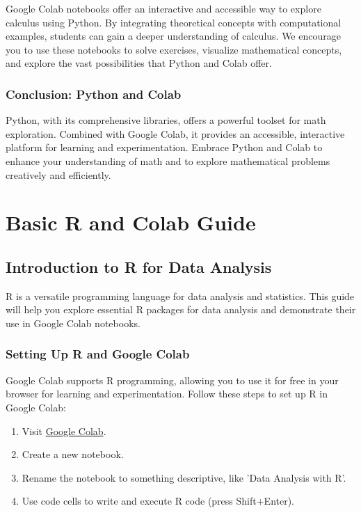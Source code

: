 \documentclass[a4paper,12pt]{book}
\newcounter{problem}
\newcounter{example}
\begin{document}
Google Colab notebooks offer an interactive and accessible way to explore calculus using Python. By integrating theoretical concepts with computational examples, students can gain a deeper understanding of calculus. We encourage you to use these notebooks to solve exercises, visualize mathematical concepts, and explore the vast possibilities that Python and Colab offer.


\subsection*{Conclusion: Python and Colab}

Python, with its comprehensive libraries, offers a powerful toolset for math exploration. Combined with Google Colab, it provides an accessible, interactive platform for learning and experimentation. Embrace Python and Colab to enhance your understanding of math and to explore mathematical problems creatively and efficiently.


\chapter{Basic R and Colab Guide}
\section*{Introduction to R for Data Analysis}

R is a versatile programming language for data analysis and statistics. This guide will help you explore essential R packages for data analysis and demonstrate their use in Google Colab notebooks.

\subsection*{Setting Up R and Google Colab}

Google Colab supports R programming, allowing you to use it for free in your browser for learning and experimentation. Follow these steps to set up R in Google Colab:

\begin{enumerate}
    \item Visit \href{https://colab.research.google.com/}{Google Colab}.
    \item Create a new notebook.
    \item Rename the notebook to something descriptive, like 'Data Analysis with R'.
    \item Use code cells to write and execute R code (press Shift+Enter).
\end{enumerate}
\end{document}
